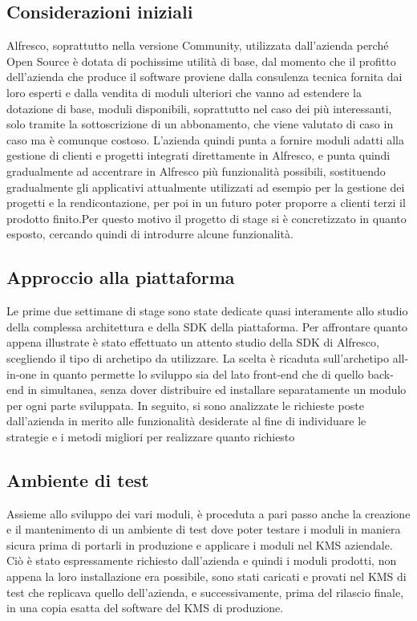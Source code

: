 \subsection{Considerazioni iniziali}
Alfresco, soprattutto nella versione Community, utilizzata dall'azienda perché Open Source è dotata di pochissime utilità di base, dal momento che il profitto dell'azienda che produce il software proviene dalla consulenza tecnica fornita dai loro esperti e dalla vendita di moduli ulteriori che vanno ad estendere la dotazione di base, moduli disponibili, soprattutto nel caso dei più interessanti, solo tramite la sottoscrizione di un abbonamento, che viene valutato di caso in caso ma è comunque costoso. L'azienda quindi punta a fornire moduli adatti alla gestione di clienti e progetti integrati direttamente in Alfresco, e punta quindi gradualmente ad accentrare in Alfresco più funzionalità possibili, sostituendo gradualmente gli applicativi attualmente utilizzati ad esempio per la gestione dei progetti e la rendicontazione, per poi in un futuro poter proporre a  clienti terzi il prodotto finito.Per questo motivo il progetto di stage si è concretizzato in quanto esposto, cercando quindi di introdurre alcune funzionalità.
\subsection{Approccio alla piattaforma}
Le prime due settimane di stage sono state dedicate quasi interamente allo studio della complessa architettura
e della SDK della piattaforma.
Per affrontare quanto appena illustrate è stato effettuato un attento studio
della SDK di Alfresco, scegliendo il tipo di archetipo da utilizzare. La scelta è
ricaduta sull’archetipo all-in-one in quanto permette lo sviluppo sia del lato front-end
che di quello back-end in simultanea, senza dover distribuire ed installare separatamente un modulo per ogni parte sviluppata.
In seguito, si sono analizzate le richieste poste dall'azienda in merito alle funzionalità desiderate al fine di individuare le strategie e i metodi migliori per realizzare quanto richiesto
\subsection{Ambiente di test}
Assieme allo sviluppo dei vari moduli, è proceduta a pari passo anche la creazione e il mantenimento di un ambiente di test dove poter testare i moduli in maniera sicura prima di portarli in produzione e applicare i moduli nel \gls{KMS} aziendale. Ciò è stato espressamente richiesto dall'azienda e quindi i moduli prodotti, non appena la loro installazione era possibile, sono stati caricati e provati nel \gls{KMS} di test che replicava quello dell'azienda, e successivamente, prima del rilascio finale, in una copia esatta del software del \gls{KMS} di produzione.
